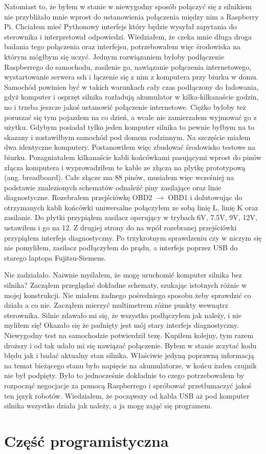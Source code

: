 \documentclass[declaration,shortabstract, inz]{iithesis}
\begin{document}
    Natomiast to, że byłem w stanie w niewygodny sposób połączyć się z silnikiem nie przybliżało mnie wprost do ustanowienia połączenia między nim a Raspberry Pi.
    Chciałem mieć Pythonowy interfejs który będzie wysyłał zapytania do sterownika i interpretował odpowiedzi. Wiedziałem, że czeka mnie długa droga badania tego połączenia oraz interfejsu, potrzebowałem więc środowiska na którym mógłbym się uczyć. Jednym rozwiązaniem byłoby podłączenie Raspberrego do samochodu, zasilenie go, nawiązanie połączenia internetowego, wystartowanie serwera ssh i łączenie się z nim z komputera przy biurku w domu. Samochód powinien być w takich warunkach cały czas podłączony do ładowania, gdyż komputer i osprzęt silnika rozładują akumulator w kilka-kilkanaście godzin, no i trzeba jeszcze jakoś ustanowić połączenie internetowe. Ciężko byłoby też poruszać się tym pojazdem na co dzień, a wcale nie zamierzałem wyjmować go z użytku. Gdybym posiadał tylko jeden komputer silnika to pewnie byłbym na to skazany i zostawiłbym samochód pod domem rodzinnym. Na szczęście miałem dwa identyczne komputery. Postanowiłem więc zbudować środowisko testowe na biurku. Pozagniatałem kilkanaście kabli końcówkami pasującymi wprost do pinów złącza komputera i wyprowadziłem te kable ze złącza na płytkę prototypową (ang. breadboard). Całe złącze ma 88 pinów, musiałem więc wcześniej na podstawie znalezionych schematów odnaleźć piny zasilające oraz linie diagnostyczne. Rozebrałem przejściówkę OBD2 $\rightarrow$ OBD1 i dolutowując do otrzymanych kabli końcówki uniwersalne połączyłem ze sobą linię L, linię K oraz zasilanie. Do płytki przypiąłem zasilacz operujący w trybach 6V, 7.5V, 9V, 12V, ustawiłem i go na 12. Z drugiej strony do na wpół rozebranej przejściówki przypiąłem interfejs diagnostyczny. Po trzykrotnym sprawdzeniu czy w niczym się nie pomyliłem, zasilacz podłączyłem do prądu, a interfejs poprzez USB do starego laptopa Fujitsu-Siemens.
    
    Nie zadziałało. Naiwnie myślałem, że mogę uruchomić komputer silnika bez silnika? Zacząłem przeglądać dokładne schematy, szukając istotnych różnic w mojej konstrukcji. Nie miałem żadnego pośredniego sposobu żeby sprawdzić co działa a co nie. Zacząłem mierzyć multimetrem różne punkty wewnątrz sterownika. Silnie zdawało mi się, że wszystko podłączyłem jak należy, i nie myliłem się! Okazało się że padnięty jest mój stary interfejs diagnostyczny. Niewygodny test na samochodzie potwierdził tezę. Kupiłem kolejny, tym razem droższy i od tak udało mi się nawiązać połączenie. Byłem w stanie zczytać kodu błędu jak i badać aktualny stan silnika. Właściwie jedyną poprawną informacją na temat bieżącego stanu było napięcie na akumulatorze, w końcu żaden czujnik nie był podpięty. Było to jednocześnie dokładnie to czego potrzebowałem by rozpocząć negocjacje za pomocą Raspberrego i spróbować przetłumaczyć jakoś ten język robotów. Wiedziałem, że począwszy od kabla USB aż pod komputer silnika wszystko działa jak należy, a ja mogę zająć się programem.

\section{Część programistyczna}


\end{document}
